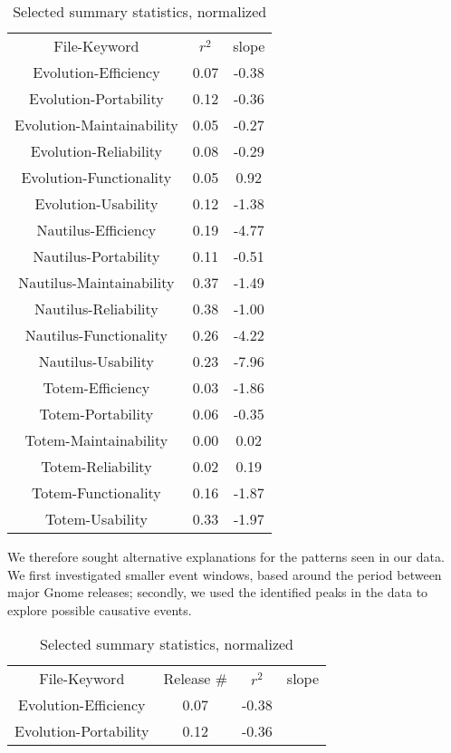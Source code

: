 \documentclass[conference, compsoc]{IEEEtran}
\begin{document}

\begin{table}
	\caption{Selected summary statistics, normalized}
	\centering
	\label{tbl:summary}
\begin{tabular}{|c|c|c|}
\hline
\rowcolor[gray]{.9} 
File-Keyword &  $r^2$ &  slope \\
Evolution-Efficiency & 0.07 & -0.38 \\
Evolution-Portability & 0.12 & -0.36 \\
Evolution-Maintainability & 0.05 & -0.27 \\
Evolution-Reliability & 0.08 & -0.29 \\
Evolution-Functionality & 0.05 & 0.92 \\
Evolution-Usability & 0.12 & -1.38 \\
Nautilus-Efficiency & 0.19 & -4.77 \\
Nautilus-Portability & 0.11 & -0.51 \\
Nautilus-Maintainability & 0.37 & -1.49 \\
Nautilus-Reliability & 0.38 & -1.00 \\
Nautilus-Functionality & 0.26 & -4.22 \\
Nautilus-Usability & 0.23 & -7.96 \\
Totem-Efficiency & 0.03 & -1.86 \\
Totem-Portability & 0.06 & -0.35 \\
Totem-Maintainability & 0.00 & 0.02 \\
Totem-Reliability & 0.02 & 0.19 \\
Totem-Functionality & 0.16 & -1.87 \\
Totem-Usability & 0.33 & -1.97 \\
\hline
\end{tabular}
\end{table}

We therefore sought alternative explanations for the patterns seen in our data. We first investigated smaller event windows, based around the period between major Gnome releases; secondly, we used the identified peaks in the data to explore possible causative events. 

\begin{table}
	\caption{Selected summary statistics, normalized}
	\centering
	\label{tbl:windows}
\begin{tabular}{|c|c|c|c|}
\hline
\rowcolor[gray]{.9} 
File-Keyword & Release \# & $r^2$ &  slope \\
Evolution-Efficiency & 0.07 & -0.38 \\
Evolution-Portability & 0.12 & -0.36 \\

\hline
\end{tabular}
\end{table}
\end{document}
